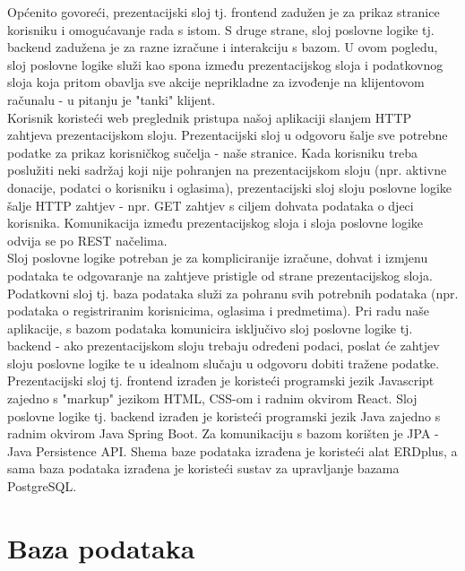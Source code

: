 		\eject

		Općenito govoreći, prezentacijski sloj tj. frontend zadužen je za prikaz stranice korisniku i omogućavanje rada s istom. S druge strane, sloj poslovne logike tj. backend zadužena je za razne izračune i interakciju s bazom. U ovom pogledu, sloj poslovne logike služi kao spona između prezentacijskog sloja i podatkovnog sloja koja pritom obavlja sve akcije neprikladne za izvođenje na klijentovom računalu - u pitanju je "tanki" klijent.\\[2pt]

		Korisnik koristeći web preglednik pristupa našoj aplikaciji slanjem HTTP zahtjeva prezentacijskom sloju. Prezentacijski sloj u odgovoru šalje sve potrebne podatke za prikaz korisničkog sučelja - naše stranice.
		Kada korisniku treba poslužiti neki sadržaj koji nije pohranjen na prezentacijskom sloju (npr. aktivne donacije, podatci o korisniku i oglasima), prezentacijski sloj sloju poslovne logike šalje HTTP zahtjev - npr. GET zahtjev s ciljem dohvata podataka o djeci korisnika.
		Komunikacija između prezentacijskog sloja i sloja poslovne logike odvija se po REST načelima.\\[2pt]

		Sloj poslovne logike potreban je za kompliciranije izračune, dohvat i izmjenu podataka te odgovaranje na zahtjeve pristigle od strane prezentacijskog sloja.
		Podatkovni sloj tj. baza podataka služi za pohranu svih potrebnih podataka (npr. podataka o registriranim korisnicima, oglasima i predmetima). Pri radu naše aplikacije, s bazom podataka komunicira isključivo sloj poslovne logike tj. backend - ako prezentacijskom sloju trebaju određeni podaci, poslat će zahtjev sloju poslovne logike te u idealnom slučaju u odgovoru dobiti tražene podatke.\\[2pt]

		Prezentacijski sloj tj. frontend izrađen je koristeći programski jezik Javascript zajedno s "markup" jezikom HTML, CSS-om i radnim okvirom React.
		Sloj poslovne logike tj. backend izrađen je koristeći programski jezik Java zajedno s radnim okvirom Java Spring Boot. Za komunikaciju s bazom korišten je JPA - Java Persistence API.
		Shema baze podataka izrađena je koristeći alat ERDplus, a sama baza podataka izrađena je koristeći sustav za upravljanje bazama PostgreSQL.

		\eject
		\section{Baza podataka}
			
